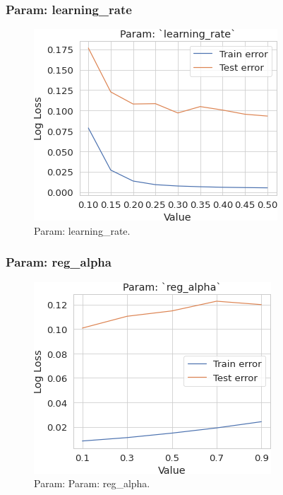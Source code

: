 \documentclass[conference]{IEEEtran}
\begin{document}
\subsubsection{Param: learning\_rate}
\begin{figure}[H]
    \centerline{\includegraphics[width=0.7\linewidth]{fig12}}
    \caption{Param: learning\_rate.}
    \label{fig12}
\end{figure}

\subsubsection{Param: reg\_alpha}
\begin{figure}[H]
    \centerline{\includegraphics[width=0.7\linewidth]{fig13}}
    \caption{Param: Param: reg\_alpha.}
    \label{fig13}
\end{figure}
\end{document}
